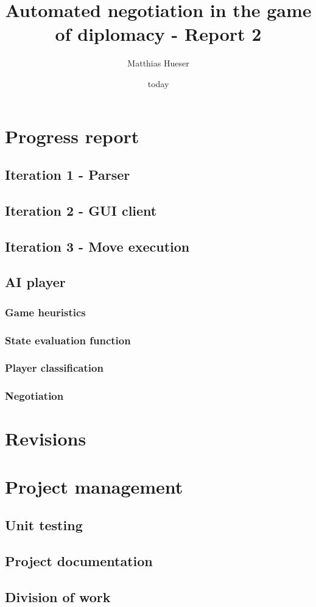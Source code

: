 \documentclass[12pt]{article}
\title{Automated negotiation in the game of diplomacy - Report 2}
\author{Matthias Hueser}
\date{today}
\begin{document}
\maketitle

\section{Progress report}

\subsection{Iteration 1 - Parser}

\subsection{Iteration 2 - GUI client}

\subsection{Iteration 3 - Move execution}

\subsection*{AI player}

\subsubsection*{Game heuristics}

\subsubsection*{State evaluation function}

\subsubsection*{Player classification}

\subsubsection*{Negotiation}

\section{Revisions}

\section{Project management}

\subsection{Unit testing}

\subsection{Project documentation}

\subsection{Division of work}



\end{document}
